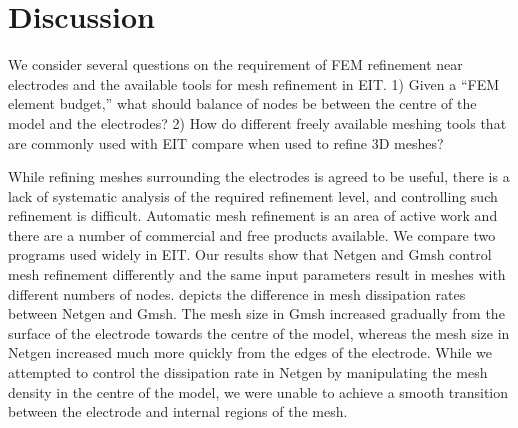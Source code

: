   
%  
%  
  
\section{Discussion}

We consider several questions on the requirement of FEM refinement near
electrodes and the available tools for mesh refinement in EIT. 
1) Given a ``FEM element budget,'' what should
balance of nodes be between the centre of the model and the electrodes?
2) How do different freely available meshing tools that are
commonly used with EIT compare when used to refine 3D meshes?

While refining meshes surrounding the electrodes  is agreed to be useful,
there is a lack of systematic analysis of
the required refinement level, and controlling such
refinement is difficult. Automatic mesh refinement is an area of active work and there are
a number of commercial and free products available. We compare two programs 
used widely in EIT.
Our results show that Netgen and Gmsh control mesh refinement differently 
and the same input parameters result in meshes with different numbers of nodes. 
 depicts the difference in
mesh dissipation rates between Netgen and Gmsh. The mesh size in Gmsh increased
gradually from the surface of the electrode  towards the centre of the model,
whereas the mesh size in Netgen increased much more quickly from the edges of the
electrode. While we attempted to control the dissipation rate in 
Netgen by manipulating the mesh density in the centre of the model, we were unable 
to achieve a smooth transition between the electrode and internal regions of the mesh. 

